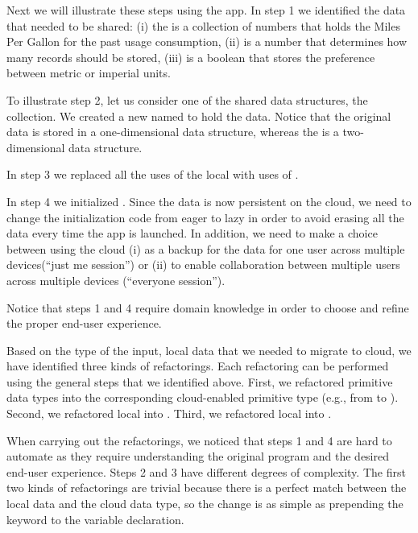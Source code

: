 \documentclass{sigplanconf}
\begin{document}
Next we will illustrate these steps using the \MT app.  In step 1 we identified the data that needed to be shared: 
(i) the  is a collection of numbers that holds the Miles Per Gallon for the past usage consumption, 
(ii)  is a number that determines how many records should be stored, 
(iii)  is a boolean that stores the preference between metric or imperial units.
   
To illustrate step 2, let us consider one of the shared data structures, the  collection. 
We created a new  named  to hold the data. Notice that the
original data is stored in a one-dimensional data structure, whereas the  is a two-dimensional data 
structure.

In step 3 we replaced all the uses of the local  with uses of . 

In step 4 we initialized  . 
Since the data is now persistent on the cloud, we need to change the initialization code from 
eager to lazy in order to avoid erasing all the data every time the app is launched.  
In addition, we need to make a choice between using the cloud (i) as a backup for the data for one user across multiple devices(``just me session'') or (ii) to enable collaboration between multiple users across multiple devices (``everyone session'').

Notice that steps 1 and 4 require domain knowledge in order to choose and refine the proper end-user experience.  
 
Based on the type of the input, local data that we needed to migrate to cloud, we have identified three kinds of refactorings. Each refactoring can be performed using the general steps that we identified above. First, we refactored primitive data 
types into the corresponding cloud-enabled primitive type (e.g., from  to ).
Second, we refactored local  into . Third, we refactored local 
into .

When carrying out the refactorings, we noticed that steps 1 and 4 are hard to automate as they require understanding the original program and the desired end-user experience. Steps 2 and 3 have different degrees of complexity. 
The first two kinds of refactorings  are trivial because there is a perfect match between the local data and the cloud data type, so the change is as simple as prepending the keyword  to the variable declaration. 
\end{document}
